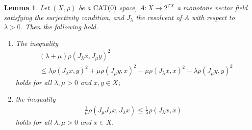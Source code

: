 \documentclass[draft]{amsart}
\numberwithin{equation}{section}
\newcommand{\CAT}{\textup{CAT}}
\theoremstyle{plain}
\newtheorem{lemma}[theorem]{Lemma}
\theoremstyle{definition}
\theoremstyle{remark}
\begin{document}
\begin{lemma}\label{lem:res-ineq}
 Let $(X, \rho)$ be a $\CAT(0)$ space, 
 $A\colon X\to 2^{TX}$ a monotone vector field 
 satisfying the surjectivity condition, 
 and $J_{\lambda}$ the resolvent of $A$ with respect to $\lambda >0$. 
 Then the following hold. 
 \begin{enumerate}
  \item[(i)] The inequality 
 \begin{align*}
  &(\lambda + \mu) \rho(J_{\lambda}x, J_{\mu}y)^2 \\
  &\leq \lambda \rho(J_{\lambda}x, y)^2 + \mu \rho(J_{\mu}y, x)^2 
  - \mu \rho(J_{\lambda}x, x)^2 - \lambda \rho(J_{\mu}y, y)^2 
 \end{align*}
  holds for all $\lambda, \mu > 0$ and $x,y\in X$; 
  \item[(ii)] the inequality 
 \begin{align*}
  \frac{1}{\mu} \rho(J_{\mu}J_{\lambda}x, J_{\lambda}x) 
  \leq \frac{1}{\lambda} \rho(J_{\lambda}x, x)
 \end{align*}
  holds for all $\lambda, \mu > 0$ and $x \in X$. 
 \end{enumerate}
\end{lemma}
\end{document}
